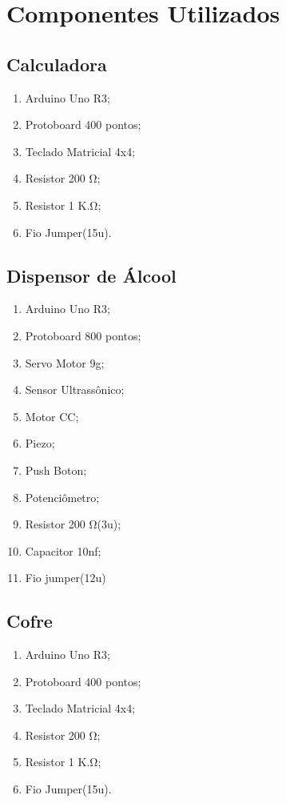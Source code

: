 \documentclass[conference]{IEEEtran}
\begin{document}
\section{Componentes Utilizados}

\subsection{Calculadora}
    \begin{enumerate}
    \item Arduino Uno R3;
    \item Protoboard 400 pontos;
    \item Teclado Matricial 4x4;
    \item Resistor 200 Ω;
    \item Resistor 1 K.Ω;
    \item Fio Jumper(15u).
    \end{enumerate}
\subsection{Dispensor de Álcool}
    \begin{enumerate}
    \item Arduino Uno R3;
    \item Protoboard 800 pontos;
    \item Servo Motor 9g;
    \item Sensor Ultrassônico;
    \item Motor CC;
    \item Piezo;
    \item Push Boton;
    \item Potenciômetro;
    \item Resistor 200 Ω(3u);
    \item Capacitor 10nf;
    \item Fio jumper(12u)
    \end{enumerate}

\subsection{Cofre}
\begin{enumerate}
    \item Arduino Uno R3;
    \item Protoboard 400 pontos;
    \item Teclado Matricial 4x4;
    \item Resistor 200 Ω;
    \item Resistor 1 K.Ω;
    \item Fio Jumper(15u).
    \end{enumerate}
\end{document}
